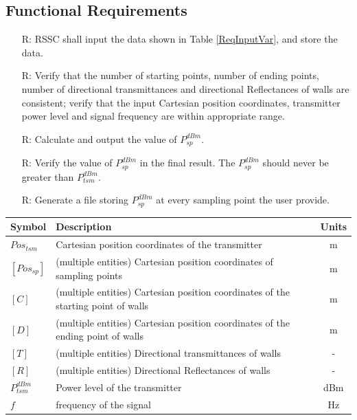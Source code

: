 \documentclass[12pt]{article}
\newcounter{reqnum} %
\begin{document}
\subsection{Functional Requirements}

\noindent \begin{itemize}

\item[R\refstepcounter{reqnum}\thereqnum \label{R_Inputs}:] RSSC shall input the
data shown in Table \ref{ReqInputVar}, and store the data.

\item[R\refstepcounter{reqnum}\thereqnum \label{R_VerifyInputs}:] Verify that 
the number of starting points, number of ending points, number of directional 
transmittances and directional Reflectances of walls are consistent; verify
that the input Cartesian position coordinates, transmitter power level and signal
frequency are within appropriate range.

\item[R\refstepcounter{reqnum}\thereqnum \label{R_Calculate}:] Calculate and output
the value of $P_{sp}^{dBm}$.

\item[R\refstepcounter{reqnum}\thereqnum \label{R_VerifyOutput}:] Verify 
the value of $P_{sp}^{dBm}$ in the final result. The $P_{sp}^{dBm}$ should never be 
greater than $P_{tsm}^{dBm}$.

\item[R\refstepcounter{reqnum}\thereqnum \label{R_Output}:] Generate a file storing
$P_{sp}^{dBm}$ at every sampling point the user provide.

\end{itemize}

\begin{table}[!h]
\caption{Required Input Variables} \label{ReqInputVar}
\renewcommand{\arraystretch}{1.2}
\noindent \begin{longtable*}{l l c} 
  \toprule
  \textbf{Symbol} & \textbf{Description} & \textbf{Units}\\
  \midrule 
  $Pos_{tsm}$ & Cartesian position coordinates of the transmitter & m\\
  $[Pos_{sp}]$ & (multiple entities) Cartesian position coordinates of sampling points & m\\
  $[C]$ & (multiple entities) Cartesian position coordinates of the starting point of walls & m\\
  $[D]$ & (multiple entities) Cartesian position coordinates of the ending point of walls & m\\
  $[T]$ & (multiple entities) Directional transmittances of walls & -\\
  $[R]$ & (multiple entities) Directional Reflectances of walls & -\\
  $P_{tsm}^{dBm}$ & Power level of the transmitter & dBm\\
  $f$ & frequency of the signal & Hz\\
  \bottomrule
\end{longtable*}
\end{table}
\end{document}
